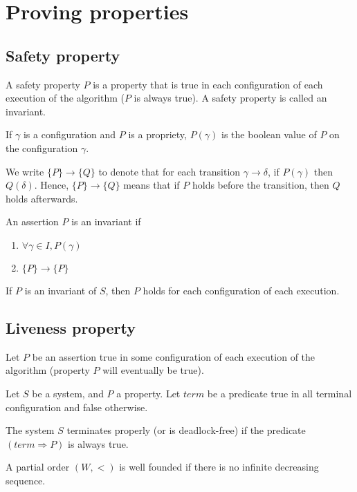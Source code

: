 \section{Proving properties}
\subsection{Safety property}

A safety property $P$ is a property that is true in each configuration of each execution of the algorithm ($P$ is always true). A safety property is called an invariant.

If $\gamma$ is a configuration and $P$ is a propriety, $P(\gamma)$ is the boolean value of $P$ on the configuration $\gamma$.

We write $\{P\}\to\{Q\}$ to denote that for each transition $\gamma \to \delta$, if $P(\gamma)$ then $Q(\delta)$. Hence, $\{P\}\to\{Q\}$ means that if $P$ holds before the transition, then $Q$ holds afterwards.

\begin{defi}
An assertion $P$ is an invariant if
\begin{enumerate}
\item $\forall \gamma \in I, P(\gamma)$
\item $\{P\}\to\{P\}$
\end{enumerate}
\end{defi}

\begin{thm}
If $P$ is an invariant of $S$, then $P$ holds for each configuration of each execution.
\end{thm}

\subsection{Liveness property}
Let $P$ be an assertion true in some configuration of each execution of the algorithm (property $P$ will eventually be true).

Let $S$ be a system, and $P$ a property. Let $term$ be a predicate true in all terminal configuration and false otherwise.

\begin{defi}
The system $S$ terminates properly (or is deadlock-free) if the predicate $(term \Rightarrow P)$ is always true.
\end{defi}

\begin{defi}
A partial order $(W,<)$ is well founded if there is no infinite decreasing sequence.
\end{defi}

